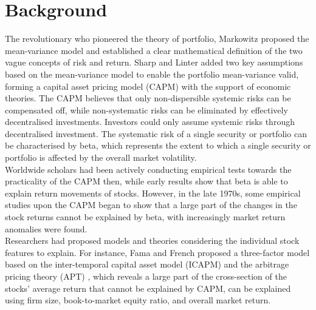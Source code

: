 \chapter[Short Chap title]{Background}
The revolutionary who pioneered the theory of portfolio, Markowitz \cite{portfolio} proposed the mean-variance model and established a clear mathematical definition of the two vague concepts of risk and return. Sharp \cite{equilibrium} and Linter \cite{diversification} added two key assumptions based on the mean-variance model to enable the portfolio mean-variance valid, forming a capital asset pricing model (CAPM) with the support of economic theories. The CAPM believes that only non-dispersible systemic risks can be compensated off, while non-systematic risks can be eliminated by effectively decentralised investments. Investors could only assume systemic risks through decentralised investment. The systematic risk of a single security or portfolio can be characterised by beta, which represents the extent to which a single security or portfolio is affected by the overall market volatility.\\[2mm]
Worldwide scholars had been actively conducting empirical tests towards the practicality of the CAPM then, while early results show that beta is able to explain return movements of stocks. However, in the late 1970s, some empirical studies upon the CAPM began to show that a large part of the changes in the stock returns cannot be explained by beta, with increasingly market return anomalies were found.\\[2mm]
Researchers had proposed models and theories considering the individual stock features to explain. For instance, Fama and French \cite{riskfactors, anomalies} proposed a three-factor model based on the inter-temporal capital asset model (ICAPM) \cite{intertemporal} and the arbitrage pricing theory (APT) \cite{options}, which reveals a large part of the cross-section of the stocks’ average return that cannot be explained by CAPM, can be explained using firm size, book-to-market equity ratio, and overall market return.\\[2mm]
